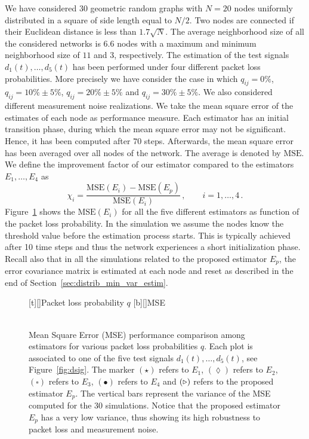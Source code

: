 \documentclass[a4paper,notitlepage,onecolumn]{article}
\def\MSE{\text{MSE}}
\numberwithin{equation}{section}
\begin{document}
We have considered 30 geometric random graphs with $N=20$ nodes
uniformly distributed in a square of side length equal to $N/2$.
Two nodes are connected if their Euclidean distance is less than
$1.7\sqrt{N}$. The average neighborhood size of all the considered
networks is $6.6$ nodes with a maximum and minimum neighborhood
size of $11$ and $3$, respectively. The estimation of the test
signals $d_1(t),\dots,d_5(t)$ has been performed under four
different packet loss probabilities. More precisely we have
consider the case in which $q_{ij}=0\%$, $q_{ij}=10\%\pm 5\%$,
$q_{ij}=20\%\pm 5\%$ and $q_{ij}=30\%\pm 5\%$. We also considered
different measurement noise realizations.
\def\MSE{\text{MSE}}
We take the mean square error of the estimates of each node  as
performance measure. Each estimator has an initial transition
phase, during which the mean square error may not be significant.
Hence, it has been computed after $70$ steps. Afterwards, the mean
square error has been averaged over all nodes of the network. The
average is denoted by $\MSE$. We define the improvement factor of
our estimator compared to the estimators $E_1,\ldots,E_4$ as $$
    \chi_i = \frac{\MSE({E_i}) -  \MSE({E_p})}{\MSE({E_i})}\,, \qquad i=1,\ldots,4\,.
$$
Figure~\ref{fig:MSE_comparison} shows the $\MSE({E_i})$ for all
the five different estimators as function of the packet loss
probability. In the simulation we assume the nodes know the
threshold value before the estimation process starts. This is
typically achieved after 10 time steps and thus the network experiences a short
initialization phase. Recall also that in all the simulations
related to the proposed estimator $E_p$, the error covariance
matrix is estimated at each node and reset as described in the end
of Section~\ref{sec:distrib_min_var_estim}.
\begin{figure}
  \centering
  [t][]{Packet loss probability $q$}
  [b][]{MSE}
  \\
  \\
  \caption{Mean Square Error (MSE) performance comparison among estimators for various packet loss probabilities $q$. Each plot is associated to one of the five test signals $d_1(t),\dots,d_5(t)$, see Figure~\ref{fig:dsig}. The marker $(\star)$ refers to $E_1$, $(\lozenge)$ refers to $E_2$, $(\square)$ refers to $E_3$, $(\bullet)$ refers to $E_4$ and $({\Large\triangleright})$ refers to the proposed estimator $E_p$. The vertical bars represent the variance of the MSE computed for the 30 simulations. Notice that the proposed estimator $E_p$ has a very low variance, thus showing its high robustness to packet loss and measurement noise.}
  \label{fig:MSE_comparison}
\end{figure}
\end{document}
